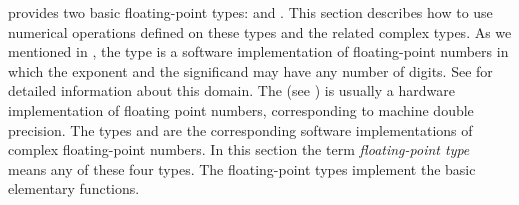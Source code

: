 %
\Language{} provides two basic floating-point types:  and
.  This section describes how to use numerical
operations defined on these types and the related complex types.
%
As we mentioned in , the  type is a software
implementation of floating-point numbers in which the exponent and the
significand may have any number of digits.
See  for detailed information about this domain.
The  (see ) is usually a hardware
implementation of floating point numbers, corresponding to machine double
precision.
The types  and  are
the corresponding software implementations of complex floating-point numbers.
In this section the term {\it floating-point type}  means any of these
four types.
%
The floating-point types implement the basic elementary functions.
